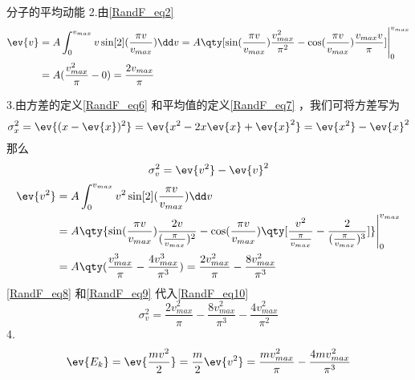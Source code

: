 \begin{example}{分子的平均动能}
2.由\autoref{RandF_eq2} 
\begin{equation}\label{RandF_eq8}
\begin{aligned}
\ev{v}&=A\int_{0}^{v_{max}} v\sin[2](\frac{\pi v}{v_{max}})\dd v=A\qty[\sin(\frac{\pi v}{v_{max}})\frac{v_{max}^2}{\pi^2}-\cos (\frac{\pi v}{v_{max}})\frac{v_{max}v}{\pi}]\Bigg|_{0}^{v_{max}}\\
&=A(\frac{v_{max}^2}{\pi}-0)=\frac{2v_{max}}{\pi}
\end{aligned}
\end{equation}

3.由方差的定义\autoref{RandF_eq6} 和平均值的定义\autoref{RandF_eq7} ，我们可将方差写为
\begin{equation}
\sigma_x^2=\ev{(x-\ev{x})^2}=\ev{x^2-2x\ev{x}+\ev{x}^2}=\ev{x^2}-\ev{x}^2
\end{equation}
那么
\begin{equation}\label{RandF_eq10}
\sigma_v^2=\ev{v^2}-\ev{v}^2
\end{equation}
\begin{equation}\label{RandF_eq9}
\begin{aligned}
\ev{v^2}&=A\int_{0}^{v_{max}} v^2\sin[2](\frac{\pi v}{v_{max}})\dd v\\
&=A\qty{\sin(\frac{\pi v}{v_{max}})\frac{2v}{(\frac{\pi }{v_{max}})^2}-\cos(\frac{\pi v}{v_{max}})\qty[\frac{v^2}{\frac{\pi}{v_{max}}}-\frac{2}{(\frac{\pi}{v_{max}})^3}]}\Bigg|_0^{v_{max}}\\
&=A\qty(\frac{v_{max}^3}{\pi}-\frac{4v_{max}^3}{\pi^3})=\frac{2v_{max}^2}{\pi}-\frac{8v_{max}^2}{\pi^3}
\end{aligned}
\end{equation}
\autoref{RandF_eq8} 和\autoref{RandF_eq9} 代入\autoref{RandF_eq10} 
\begin{equation}
\sigma_v^2=\frac{2v_{max}^2}{\pi}-\frac{8v_{max}^2}{\pi^3}-\frac{4v_{max}^2}{\pi^2}
\end{equation}
4.
\begin{equation}
\ev{E_k}=\ev{\frac{mv^2}{2}}=\frac{m}{2}\ev{v^2}=\frac{mv_{max}^2}{\pi}-\frac{4mv_{max}^2}{\pi^3}
\end{equation}
\end{example}